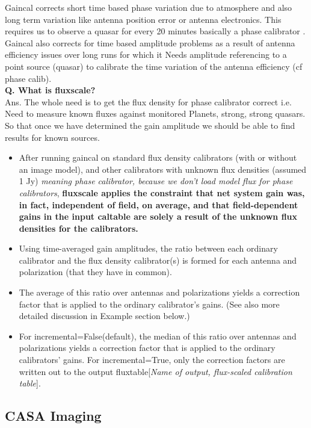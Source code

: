 \documentclass[10pt]{report}
\newcommand{\tbf}[1]{\textbf{#1}}
\newcommand{\tit}[1]{\textit{#1}}
\begin{document}
Gaincal corrects short time  based phase variation due to atmosphere  and also long term variation like antenna position error or antenna electronics. This requires us to observe a quasar for every 20 minutes  basically a phase calibrator .\\

Gaincal also corrects for time based amplitude problems as a result of antenna efficiency issues over long runs for which it Needs amplitude referencing to a point source (quasar) to calibrate the time variation of the antenna efficiency (cf phase calib).\\

\tbf{Q. What is fluxscale?}\\

Ans. The whole need is to get the flux density for phase calibrator correct i.e. Need to measure known fluxes against monitored Planets, strong, strong quasars. So that once we have determined the gain amplitude we should be able to find results for known sources.
\begin{itemize}
\item After running gaincal on standard flux density calibrators (with or without an image model), and other calibrators with unknown flux densities (assumed 1 Jy) \tit{meaning phase calibrator, because we don't load model flux for phase calibrators}, \tbf{fluxscale applies the constraint that net system gain was, in fact, independent of field, on average, and that field-dependent gains in the input caltable are solely a result of the unknown flux densities for the calibrators.}
\item Using time-averaged gain amplitudes, the ratio between each ordinary calibrator and the flux density calibrator(s) is formed for each antenna and polarization (that they have in common).
\item The average of this ratio over antennas and polarizations yields a correction factor that is applied to the ordinary calibrator's gains. (See also more detailed discussion in Example section below.)
\item For incremental=False(default), the median of this ratio over antennas and polarizations yields a correction factor that is applied to the ordinary calibrators’ gains. For incremental=True, only the correction factors are written out to the output fluxtable[\tit{Name of output, flux-scaled calibration table}].  
 
\end{itemize}
\subsection{CASA Imaging}
\end{document}
